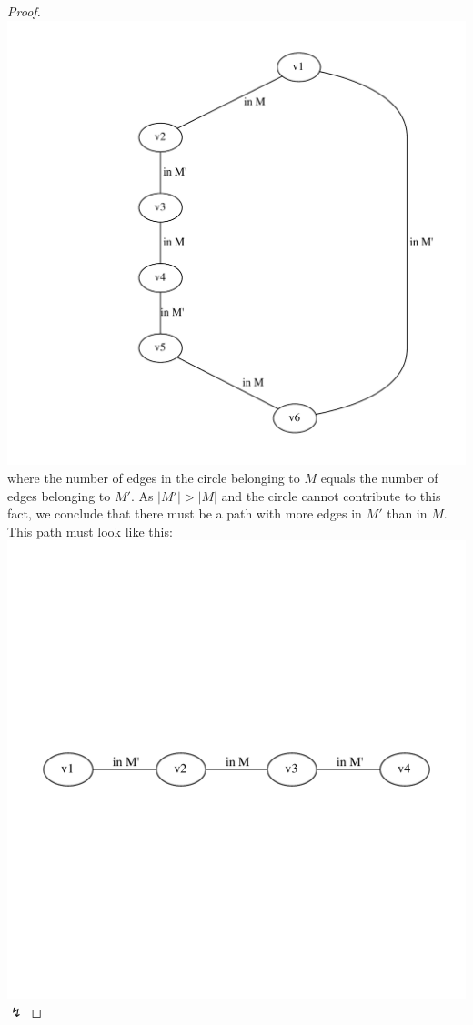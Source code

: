 \begin{proof}
		\includegraphics[scale=0.5]{diagrams/Chapter4_Example10.pdf}\\
where the number of edges in the circle belonging to $M$ equals the number of
edges
belonging to $M'$. As $|M'| > |M|$ and the circle cannot contribute to this
fact, we conclude that there must be a path with more edges in $M'$ than in $M$.
This path must look like this:
\includegraphics[scale=0.5]{diagrams/Chapter4_Example11.pdf}\\
$\lightning$
\end{proof}
